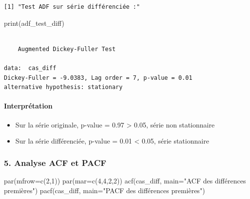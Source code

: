 \documentclass[
  letterpaper,
  DIV=11,
  numbers=noendperiod]{scrartcl}
\let\oldparagraph\paragraph
\renewcommand{\paragraph}[1]{\oldparagraph{#1}\mbox{}}
\newenvironment{Shaded}{\begin{snugshade}}{\end{snugshade}}
\newcommand{\AttributeTok}[1]{\textcolor[rgb]{0.40,0.45,0.13}{#1}}
\newcommand{\DecValTok}[1]{\textcolor[rgb]{0.68,0.00,0.00}{#1}}
\newcommand{\FunctionTok}[1]{\textcolor[rgb]{0.28,0.35,0.67}{#1}}
\newcommand{\NormalTok}[1]{\textcolor[rgb]{0.00,0.23,0.31}{#1}}
\newcommand{\StringTok}[1]{\textcolor[rgb]{0.13,0.47,0.30}{#1}}
\begin{document}
\begin{verbatim}
[1] "Test ADF sur série différenciée :"
\end{verbatim}

\begin{Shaded}
\begin{Highlighting}[]
\FunctionTok{print}\NormalTok{(adf\_test\_diff)}
\end{Highlighting}
\end{Shaded}

\begin{verbatim}

    Augmented Dickey-Fuller Test

data:  cas_diff
Dickey-Fuller = -9.0383, Lag order = 7, p-value = 0.01
alternative hypothesis: stationary
\end{verbatim}

\paragraph{Interprétation}\label{interpruxe9tation-2}

\begin{itemize}
\item
  Sur la série originale, p-value = 0.97 \textgreater{} 0.05, série non
  stationnaire
\item
  Sur la série différenciée, p-value = 0.01 \textless{} 0.05, série
  stationnaire
\end{itemize}

\subsubsection{5. Analyse ACF et PACF}\label{analyse-acf-et-pacf}

\begin{Shaded}
\begin{Highlighting}[]
\FunctionTok{par}\NormalTok{(}\AttributeTok{mfrow=}\FunctionTok{c}\NormalTok{(}\DecValTok{2}\NormalTok{,}\DecValTok{1}\NormalTok{))}
\FunctionTok{par}\NormalTok{(}\AttributeTok{mar=}\FunctionTok{c}\NormalTok{(}\DecValTok{4}\NormalTok{,}\DecValTok{4}\NormalTok{,}\DecValTok{2}\NormalTok{,}\DecValTok{2}\NormalTok{))}
\FunctionTok{acf}\NormalTok{(cas\_diff, }\AttributeTok{main=}\StringTok{"ACF des différences premières"}\NormalTok{)}
\FunctionTok{pacf}\NormalTok{(cas\_diff, }\AttributeTok{main=}\StringTok{"PACF des différences premières"}\NormalTok{)}
\end{Highlighting}
\end{Shaded}
\end{document}
